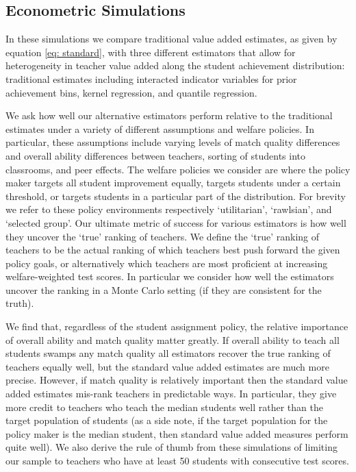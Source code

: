 \documentclass[letterpaper,12pt]{article}
\begin{document}
\subsection{Econometric Simulations}

In these simulations we compare traditional value added estimates, as given by equation \ref{eq: standard}, with three different estimators that allow for heterogeneity in teacher value added along the student achievement distribution: traditional estimates including interacted indicator variables for prior achievement bins, kernel regression, and quantile regression.

We ask how well our alternative estimators perform relative to the traditional estimates under a variety of different assumptions and welfare policies. In particular, these assumptions include varying levels of match quality differences and overall ability differences between teachers, sorting of students into classrooms, and peer effects. The welfare policies we consider are where the policy maker targets all student improvement equally, targets students under a certain threshold, or targets students in a particular part of the distribution. For brevity we refer to these policy environments respectively `utilitarian', `rawlsian', and `selected group'. Our ultimate metric of success for various estimators is how well they uncover the `true' ranking of teachers. We define the `true' ranking of teachers to be the actual ranking of which teachers best push forward the given policy goals, or alternatively which teachers are most proficient at increasing welfare-weighted test scores. In particular we consider how well the estimators uncover the ranking in a Monte Carlo setting (if they are consistent for the truth).

We find that, regardless of the student assignment policy, the relative importance of overall ability and match quality matter greatly. If overall ability to teach all students swamps any match quality all estimators recover the true ranking of teachers equally well, but the standard value added estimates are much more precise. However, if match quality is relatively important then the standard value added estimates mis-rank teachers in predictable ways. In particular, they give more credit to teachers who teach the median students well rather than the target population of students (as a side note, if the target population for the policy maker is the median student, then standard value added measures perform quite well). We also derive the rule of thumb from these simulations of limiting our sample to teachers who have at least 50 students with consecutive test scores.
\end{document}
